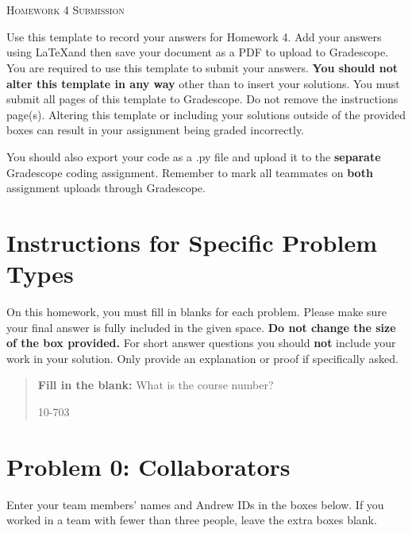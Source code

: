 \documentclass[12pt]{article}
\begin{document}
\section*{}
\begin{center}
  \centerline{\textsc{\LARGE  Homework 4 Submission}}
\end{center}

Use this template to record your answers for Homework 4.  Add your answers using \LaTeX and then save your document as a PDF to upload to Gradescope.  You are required to use this template to submit your answers.  \textbf{You should not alter this template in any way} other than to insert your solutions.  You must submit all \pageref{LastPage} pages of this template to Gradescope.  Do not remove the instructions page(s).  Altering this template or including your solutions outside of the provided boxes can result in your assignment being graded incorrectly.

You should also export your code as a .py file and upload it to the \textbf{separate} Gradescope coding assignment. Remember to mark all teammates on \textbf{both} assignment uploads through Gradescope.

\section*{Instructions for Specific Problem Types}

On this homework, you must fill in blanks for each problem. Please make sure your final answer is fully included in the given space.  \textbf{Do not change the size of the box provided.}  For short answer questions you should \textbf{not} include your work in your solution.  Only provide an explanation or proof if specifically asked.

\begin{quote}
\textbf{Fill in the blank:} What is the course number?

\begin{tcolorbox}[fit,height=1cm, width=4cm, blank, borderline={1pt}{-2pt},nobeforeafter]
    \begin{center}\huge10-703\end{center}
    \end{tcolorbox}
\end{quote}

\newpage

\section*{Problem 0: Collaborators}
Enter your team members' names and Andrew IDs in the boxes below. If you worked in a team with fewer than three people, leave the extra boxes blank.
\end{document}
